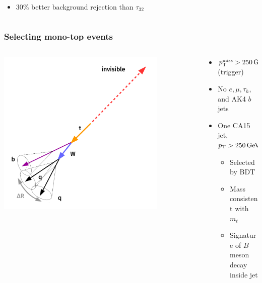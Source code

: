 \documentclass[aspectratio=169,xcolor=dvipsnames,,table,compress]{beamer}
\begin{document}
\begin{frame}[t]
\begin{columns}[T]
\begin{column}{0.33\textwidth}
      \vspace{-3mm}
    \begin{itemize}
      \item {\small 30\% better background rejection than $\tau_{32}$ }
    \end{itemize}
  \end{column}
  \end{columns}
\end{frame}

\begin{frame}[t]  \frametitle{Selecting mono-top events}
  \vspace{-5mm}
  \begin{columns}[T]
  \begin{column}{0.5\textwidth}
  \centering
    \includegraphics[width=0.8\textwidth]{../figures/talk/boosted_event.pdf}
  \end{column}
  \begin{column}{0.5\textwidth}
    \begin{itemize}
      \item $p_\text{T}^\text{miss}>250\,\text{GeV}$ (trigger)
      \item No $e,\mu,\tau_h$, and AK4 $b$ jets
      \item One CA15 jet, $p_\text{T}>250\,\text{GeV}$
      \begin{itemize}
        \item Selected by BDT \pause
        \item Mass consistent with $m_t$
        \item Signature of $B$ meson decay inside jet

\end{itemize}
\end{itemize}
\end{column}
\end{columns}
\end{frame}
\end{document}
